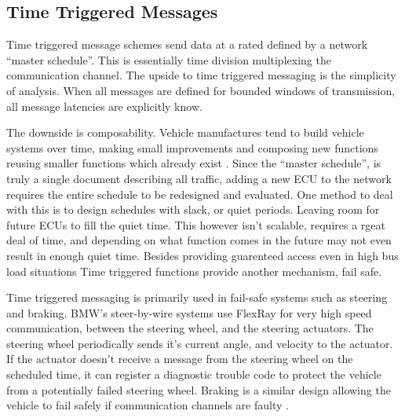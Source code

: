 \documentclass[conference,12pt]{IEEEtran}
\begin{document}
\subsection{Time Triggered Messages}
\label{sec:time_trigger}
Time triggered message schemes send data at a rated defined by a network
``master schedule''. This is essentially time division multiplexing the
communication channel. The upside to time triggered messaging is the simplicity
of analysis. When all messages are defined for bounded windows of transmission,
all message latencies are explicitly know.  

The downside is
composability. Vehicle manufactures tend to build vehicle systems over time,
making small improvements and composing new functions reusing smaller functions
which already exist \autocite{ludanek_improved_2006}. Since the ``master
schedule'', is truly a single document describing all traffic, adding a new ECU
to the network requires the entire schedule to be redesigned and evaluated. One
method to deal with this is to design schedules with slack, or quiet periods.
Leaving room for future ECUs to fill the quiet time. This however isn't
scalable, requires a rgeat deal of time, and depending on what function comes in
the future may not even result in enough quiet time. Besides providing
guarenteed access even in high bus load situations Time triggered functions
provide another mechanism, fail safe. 

Time triggered messaging is primarily used in fail-safe systems such as steering
and braking. BMW's steer-by-wire systems use FlexRay for very high speed
communication, between the steering wheel, and the steering actuators. The
steering wheel periodically sends it's current angle, and velocity to the
actuator. If the actuator doesn't receive a message from the steering wheel on
the scheduled time, it can register a diagnostic trouble code to protect the vehicle
from a potentially failed steering wheel.  Braking is a similar design allowing
the vehicle to fail safely if communication channels are faulty
\autocite{wang_high_2011}. 
\end{document}
